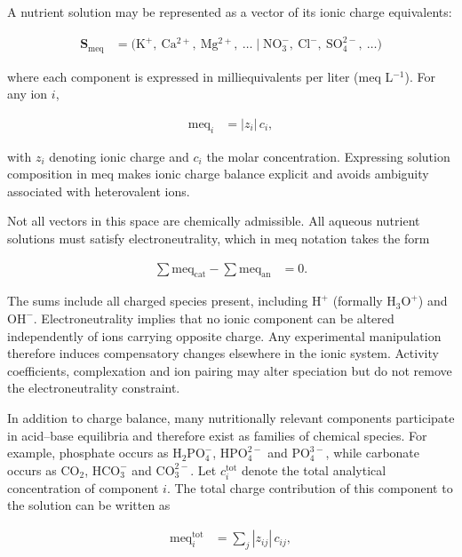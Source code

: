 \documentclass[
  letterpaper,
  DIV=11,
  numbers=noendperiod]{scrreprt}
\begin{document}
A nutrient solution may be represented as a vector of its ionic charge
equivalents:

\begin{align*}
\mathbf{S}_{\mathrm{meq}} &=
\bigl(
\mathrm{K^+},\ \mathrm{Ca^{2+}},\ \mathrm{Mg^{2+}},\ \dots
\;\big|\;
\mathrm{NO_3^-},\ \mathrm{Cl^-},\ \mathrm{SO_4^{2-}},\ \dots
\bigr)
\end{align*}

where each component is expressed in milliequivalents per liter (meq
L\(^{-1}\)). For any ion \(i\),

\begin{align*}
\mathrm{meq}_i &= |z_i|\, c_i ,
\end{align*}

with \(z_i\) denoting ionic charge and \(c_i\) the molar concentration.
Expressing solution composition in meq makes ionic charge balance
explicit and avoids ambiguity associated with heterovalent ions.

Not all vectors in this space are chemically admissible. All aqueous
nutrient solutions must satisfy electroneutrality, which in meq notation
takes the form

\begin{align*}
\sum \mathrm{meq}_{\text{cat}} - \sum \mathrm{meq}_{\text{an}} &= 0 .
\end{align*}

The sums include all charged species present, including \(\mathrm{H^+}\)
(formally \(\mathrm{H_3O^+}\)) and \(\mathrm{OH^-}\). Electroneutrality
implies that no ionic component can be altered independently of ions
carrying opposite charge. Any experimental manipulation therefore
induces compensatory changes elsewhere in the ionic system. Activity
coefficients, complexation and ion pairing may alter speciation but do
not remove the electroneutrality constraint.

In addition to charge balance, many nutritionally relevant components
participate in acid--base equilibria and therefore exist as families of
chemical species. For example, phosphate occurs as
\(\mathrm{H_2PO_4^-}\), \(\mathrm{HPO_4^{2-}}\) and
\(\mathrm{PO_4^{3-}}\), while carbonate occurs as \(\mathrm{CO_2}\),
\(\mathrm{HCO_3^-}\) and \(\mathrm{CO_3^{2-}}\). Let
\(c_i^{\mathrm{tot}}\) denote the total analytical concentration of
component \(i\). The total charge contribution of this component to the
solution can be written as

\begin{align*}
\mathrm{meq}_i^{\mathrm{tot}}
&= \sum_j |z_{ij}|\, c_{ij} ,
\end{align*}
\end{document}
